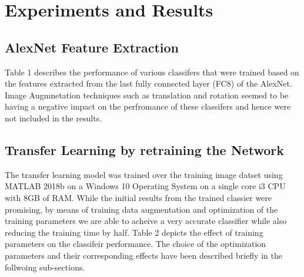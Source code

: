 \documentclass[doc/report.tex]{subfiles}
\begin{document}
\section{Experiments and Results}
\subsection{AlexNet Feature Extraction}
Table 1 describes the performance of various classifers that were trained based on the features extracted from the last fully connected layer (FC8) of the AlexNet. Image Augmnetation techniques such as translation and rotation seemed to be having a negative impact on the perfromance of these classifers and hence were not included in the results.

\begin{table}[]
\centering
\caption{Accuracy of various trained classifers}
\label{tab:my-table1}
\end{table}

\subsection{Transfer Learning by retraining the Network}
The transfer learning model was trained over the training image datset using MATLAB 2018b on a Windows 10 Operating System on a single core i3 CPU with 8GB of RAM. While the initial results from the trained classier were promising, by means of training data augmentation and optimization of the training parameters we are able to acheive a very accurate classifier while also reducing the training time by half. Table 2 depicts the effect of training parameters on the classifeir performance. The choice of the optimization parameters and their corresponding effects have been described briefly in the follwoing sub-sections.
\end{document}
